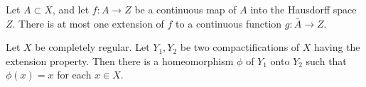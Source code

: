 \documentclass{article}
\begin{document}
  \begin{lemma}
  Let $A \subset X$, and let $f: A \longrightarrow Z$ be a continuous map of $A$ into the Hausdorff space $Z$. There is at most one extension of $f$ to a continuous function $g: \bar{A} \longrightarrow Z$. 
  \end{lemma}

  \begin{theorem}
  Let $X$ be completely regular. Let $Y_1, Y_2$ be two compactifications of $X$ having the extension property. Then there is a homeomorphism $\phi$ of $Y_1$ onto $Y_2$ such that $\phi(x) = x$ for each $x \in X$. 
  \end{theorem}
\end{document}
